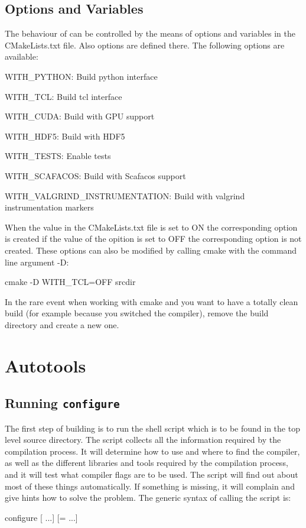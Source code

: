 \subsection{Options and Variables}
The behaviour of  can be
controlled by the means of options and variables in the CMakeLists.txt file. Also options are defined there.
The following options are available:
\begin{description}
	\item WITH_PYTHON: Build python interface
	\item WITH_TCL: Build tcl interface
	\item WITH_CUDA: Build with GPU support
        \item WITH_HDF5: Build with HDF5
	\item WITH_TESTS: Enable tests
	\item WITH_SCAFACOS: Build with Scafacos support
	\item WITH_VALGRIND_INSTRUMENTATION: Build with valgrind instrumentation markers
\end{description}
When the value in the CMakeLists.txt file is set to ON the corresponding option is created if the value of the opition is set to OFF the corresponding option is not created. 
These options can also be modified by calling cmake with the command line argument -D:
\begin{code}
cmake -D WITH_TCL=OFF srcdir 
\end{code}
In the rare event when working with cmake and you want to have a totally clean build (for example because you switched the compiler), remove the build directory and create a new one.
\section{Autotools}
\subsection{Running \texttt{configure}}
\label{sec:configure}

The first step of building \es is to run the shell script
 which is to be found in the top level source
directory.  The script collects all the information required by the
compilation process.  It will determine how to use and where to find
the compiler, as well as the different libraries and tools required by
the compilation process, and it will test what compiler flags are to
be used.  The script will find out about most of these things
automatically.  If something is missing, it will complain and give
hints how to solve the problem.  The generic syntax of calling the
 script is:
\begin{code}
configure [ ...] [= ...]
\end{code}

